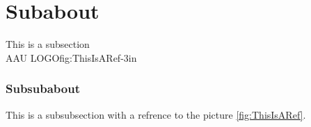 \section{Subabout}
This is a subsection\\
	{AAU LOGO}{fig:ThisIsARef}{-3in}

\subsubsection{Subsubabout}
This is a subsubsection with a refrence to the picture \ref{fig:ThisIsARef}.
